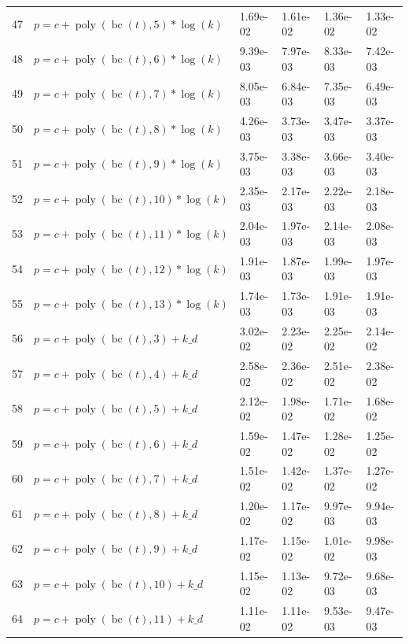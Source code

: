 \documentclass[12pt,a4paper]{article}
\DeclareMathOperator{\bc}{bc}
\DeclareMathOperator{\poly}{poly}
\begin{document}
\begin{longtable}[t]{ll>{\raggedleft\arraybackslash}p{2cm}>{\raggedleft\arraybackslash}p{2cm}>{\raggedleft\arraybackslash}p{2cm}>{\raggedleft\arraybackslash}p{2cm}}
\rowcolor{gray!6}  47 & $p = c + \poly\left( \bc(t), 5 \right) * \log(k)$ & 1.69e-02 & 1.61e-02 & 1.36e-02 & 1.33e-02\\
48 & $p = c + \poly\left( \bc(t), 6 \right) * \log(k)$ & 9.39e-03 & 7.97e-03 & 8.33e-03 & 7.42e-03\\
\rowcolor{gray!6}  49 & $p = c + \poly\left( \bc(t), 7 \right) * \log(k)$ & 8.05e-03 & 6.84e-03 & 7.35e-03 & 6.49e-03\\
50 & $p = c + \poly\left( \bc(t), 8 \right) * \log(k)$ & 4.26e-03 & 3.73e-03 & 3.47e-03 & 3.37e-03\\
\rowcolor{gray!6}  51 & $p = c + \poly\left( \bc(t), 9 \right) * \log(k)$ & 3.75e-03 & 3.38e-03 & 3.66e-03 & 3.40e-03\\
52 & $p = c + \poly\left( \bc(t), 10 \right) * \log(k)$ & 2.35e-03 & 2.17e-03 & 2.22e-03 & 2.18e-03\\
\rowcolor{gray!6}  53 & $p = c + \poly\left( \bc(t), 11 \right) * \log(k)$ & 2.04e-03 & 1.97e-03 & 2.14e-03 & 2.08e-03\\
54 & $p = c + \poly\left( \bc(t), 12 \right) * \log(k)$ & 1.91e-03 & 1.87e-03 & 1.99e-03 & 1.97e-03\\
\rowcolor{gray!6}  55 & $p = c + \poly\left( \bc(t), 13 \right) * \log(k)$ & 1.74e-03 & 1.73e-03 & 1.91e-03 & 1.91e-03\\
56 & $p = c + \poly\left( \bc(t), 3 \right) + k\_d$ & 3.02e-02 & 2.23e-02 & 2.25e-02 & 2.14e-02\\
\rowcolor{gray!6}  57 & $p = c + \poly\left( \bc(t), 4 \right) + k\_d$ & 2.58e-02 & 2.36e-02 & 2.51e-02 & 2.38e-02\\
58 & $p = c + \poly\left( \bc(t), 5 \right) + k\_d$ & 2.12e-02 & 1.98e-02 & 1.71e-02 & 1.68e-02\\
\rowcolor{gray!6}  59 & $p = c + \poly\left( \bc(t), 6 \right) + k\_d$ & 1.59e-02 & 1.47e-02 & 1.28e-02 & 1.25e-02\\
60 & $p = c + \poly\left( \bc(t), 7 \right) + k\_d$ & 1.51e-02 & 1.42e-02 & 1.37e-02 & 1.27e-02\\
\rowcolor{gray!6}  61 & $p = c + \poly\left( \bc(t), 8 \right) + k\_d$ & 1.20e-02 & 1.17e-02 & 9.97e-03 & 9.94e-03\\
62 & $p = c + \poly\left( \bc(t), 9 \right) + k\_d$ & 1.17e-02 & 1.15e-02 & 1.01e-02 & 9.98e-03\\
\rowcolor{gray!6}  63 & $p = c + \poly\left( \bc(t), 10 \right) + k\_d$ & 1.15e-02 & 1.13e-02 & 9.72e-03 & 9.68e-03\\
64 & $p = c + \poly\left( \bc(t), 11 \right) + k\_d$ & 1.11e-02 & 1.11e-02 & 9.53e-03 & 9.47e-03\\

\end{longtable}
\end{document}
